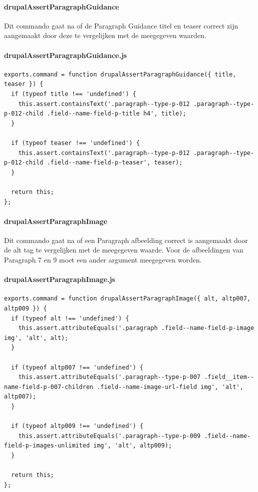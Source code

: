 \clearpage
\paragraph{drupalAssertParagraphGuidance}
\label{commando5}
Dit commando gaat na of de Paragraph Guidance titel en teaser correct zijn aangemaakt door deze te vergelijken met de meegegeven waarden.
\paragraph{drupalAssertParagraphGuidance.js}
\begin{lstlisting}[breaklines=true]
exports.command = function drupalAssertParagraphGuidance({ title, teaser }) {
  if (typeof title !== 'undefined') {
    this.assert.containsText('.paragraph--type-p-012 .paragraph--type-p-012-child .field--name-field-p-title h4', title);
  }

  if (typeof teaser !== 'undefined') {
    this.assert.containsText('.paragraph--type-p-012 .paragraph--type-p-012-child .field--name-field-p-teaser', teaser);
  }

  return this;
};
\end{lstlisting}


\clearpage
\paragraph{drupalAssertParagraphImage}
\label{commando6}
Dit commando gaat na of een Paragraph afbeelding correct is aangemaakt door de alt tag te vergelijken met de meegegeven waarde. Voor de afbeeldingen van Paragraph 7 en 9 moet een ander argument meegegeven worden.
\paragraph{drupalAssertParagraphImage.js}
\begin{lstlisting}[breaklines=true]
exports.command = function drupalAssertParagraphImage({ alt, altp007, altp009 }) {
  if (typeof alt !== 'undefined') {
    this.assert.attributeEquals('.paragraph .field--name-field-p-image img', 'alt', alt);
  }

  if (typeof altp007 !== 'undefined') {
    this.assert.attributeEquals('.paragraph--type-p-007 .field__item--name-field-p-007-children .field--name-image-url-field img', 'alt', altp007);
  }

  if (typeof altp009 !== 'undefined') {
    this.assert.attributeEquals('.paragraph--type-p-009 .field--name-field-p-images-unlimited img', 'alt', altp009);
  }

  return this;
};
\end{lstlisting}


